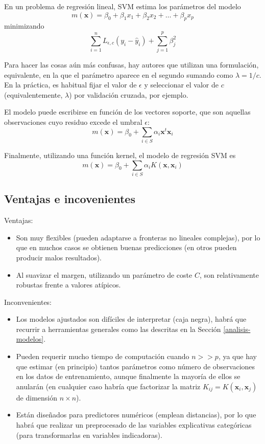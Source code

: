 \documentclass[
  spanish,
]{book}
\theoremstyle{break}
\theoremstyle{definition}
\theoremstyle{definition}
\theoremstyle{definition}
\theoremstyle{definition}
\theoremstyle{remark}
\begin{document}
En un problema de regresión lineal, SVM estima los parámetros del modelo
\[m(\mathbf{x}) = \beta_0 + \beta_1 x_1 + \beta_2 x_2 + \ldots + \beta_p x_p\]
minimizando
\[\sum_{i=1}^n L_{\epsilon,c} (y_i - \hat y_i) + \sum_{j=1}^p \beta_j^2\]

Para hacer las cosas aún más confusas, hay autores que utilizan una formulación, equivalente, en la que el parámetro aparece en el segundo sumando como \(\lambda = 1/c\). En la práctica, es habitual fijar el valor de \(\epsilon\) y seleccionar el valor de \(c\) (equivalentemente, \(\lambda\)) por validación cruzada, por ejemplo.

El modelo puede escribirse en función de los vectores soporte, que son aquellas observaciones cuyo residuo excede el umbral \(\epsilon\):
\[m(\mathbf{x}) = \beta_0 + \sum_{i\in S} \alpha_i \mathbf{x}^t \mathbf{x}_i\]

Finalmente, utilizando una función kernel, el modelo de regresión SVM es
\[m(\mathbf{x}) = \beta_0 + \sum_{i\in S} \alpha_i K(\mathbf{x}, \mathbf{x}_i)\]

\hypertarget{ventajas-e-incovenientes}{%
\subsection{Ventajas e incovenientes}\label{ventajas-e-incovenientes}}

Ventajas:

\begin{itemize}
\item
  Son muy flexibles (pueden adaptarse a fronteras no lineales complejas), por lo que en muchos casos se obtienen buenas predicciones (en otros pueden producir malos resultados).
\item
  Al suavizar el margen, utilizando un parámetro de coste \(C\), son relativamente robustas frente a valores atípicos.
\end{itemize}

Inconvenientes:

\begin{itemize}
\item
  Los modelos ajustados son difíciles de interpretar (caja negra), habrá que recurrir a herramientas generales como las descritas en la Sección \ref{analisis-modelos}.
\item
  Pueden requerir mucho tiempo de computación cuando \(n >> p\), ya que hay que estimar (en principio) tantos parámetros como número de observaciones en los datos de entrenamiento, aunque finalmente la mayoría de ellos se anularán (en cualquier caso habría que factorizar la matriz \(K_{ij} = K(\mathbf{x}_i, \mathbf{x}_j)\) de dimensión \(n \times n\)).
\item
  Están diseñados para predictores numéricos (emplean distancias), por lo que habrá que realizar un preprocesado de las variables explicativas categóricas (para transformarlas en variables indicadoras).
\end{itemize}
\end{document}
